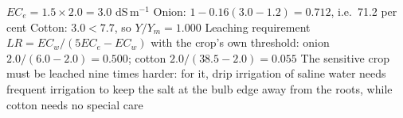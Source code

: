 \sol {}\ans $EC_e=1.5\times2.0=3.0$ dS\,m$^{-1}$ \ans Onion: $1-0.16(3.0-1.2)=0.712$, i.e.\ 71.2 per cent \ans Cotton: $3.0<7.7$, so $Y/Y_m=1.000$ \ans Leaching requirement $LR=EC_w/(5EC_e-EC_w)$ with the crop's own threshold: onion $2.0/(6.0-2.0)=0.500$; cotton $2.0/(38.5-2.0)=0.055$ \ans The sensitive crop must be leached nine times harder: for it, drip irrigation of saline water needs frequent irrigation to keep the salt at the bulb edge away from the roots, while cotton needs no special care \finans

